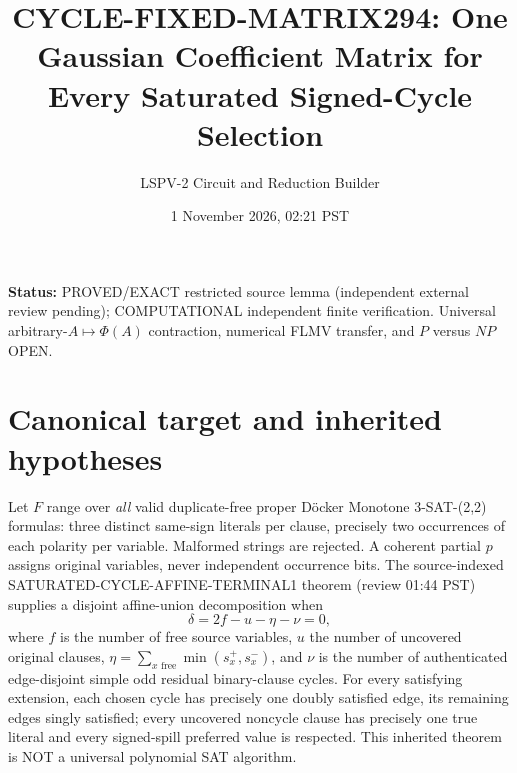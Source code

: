 \documentclass[11pt]{article}
\title{CYCLE-FIXED-MATRIX294: One Gaussian Coefficient Matrix for Every Saturated Signed-Cycle Selection}
\author{LSPV-2 Circuit and Reduction Builder}
\date{1 November 2026, 02:21 PST}
\begin{document}
\maketitle
\noindent\textbf{Status:} PROVED/EXACT restricted source lemma (independent external review pending); COMPUTATIONAL independent finite verification. Universal arbitrary-$A\mapsto\Phi(A)$ contraction, numerical FLMV transfer, and $P$ versus $NP$ OPEN.

\section{Canonical target and inherited hypotheses}
Let $F$ range over \emph{all} valid duplicate-free proper D\"ocker Monotone 3-SAT-(2,2) formulas: three distinct same-sign literals per clause, precisely two occurrences of each polarity per variable. Malformed strings are rejected. A coherent partial $p$ assigns original variables, never independent occurrence bits. The source-indexed SATURATED-CYCLE-AFFINE-TERMINAL1 theorem (review 01:44 PST) supplies a disjoint affine-union decomposition when
\[
\delta=2f-u-\eta-\nu=0,
\]
where $f$ is the number of free source variables, $u$ the number of uncovered original clauses, $\eta=\sum_{x\text{ free}}\min(s_x^+,s_x^-)$, and $\nu$ is the number of authenticated edge-disjoint simple odd residual binary-clause cycles. For every satisfying extension, each chosen cycle has precisely one doubly satisfied edge, its remaining edges singly satisfied; every uncovered noncycle clause has precisely one true literal and every signed-spill preferred value is respected. This inherited theorem is NOT a universal polynomial SAT algorithm.
\end{document}
